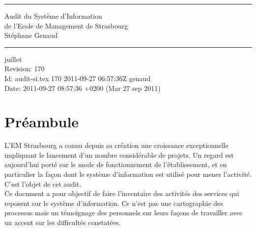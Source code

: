 \documentclass{book}
\begin{document}
\newcommand{\motcle}[1]{\index{#1}{#1}}
\newcommand{\clecommun}{stockage partagé en réseau\xspace}
\newcommand{\sre}{service relations entreprises\xspace}
\newcommand{\srh}{service ressources humaines\xspace}
\newcommand{\sop}{service organisation et process\xspace}
\newcommand{\scom}{service communication\xspace}
\newcommand{\sconc}{service concours\xspace}
\newcommand{\sintl}{service international\xspace}
\newcommand{\CK}{Christos Karacostas\xspace}
\newcommand{\NB}{Nicolas Beyhurst\xspace}


\thispagestyle{empty}
\rhead[]{}
\pagestyle{fancy}
\setlength{\parindent}{0mm}
\setlength{\parskip}{0mm}
\rule{\linewidth}{1mm}
\begin{center}
\Large{Audit du Système d'Information}\\[5mm]
\Large{de l'Ecole de Management de Strasbourg}\\[5mm]
\large{Stéphane Genaud}
\rule{\linewidth}{1mm}
\end{center}
\begin{center}
juillet  \\
\textrm{
Revision: 170 \\
Id: audit-si.tex 170 2011-09-27 06:57:36Z genaud\\
Date: 2011-09-27 08:57:36 +0200 (Mar 27 sep 2011)\\
}
\end{center}

\tableofcontents
\newpage


\chapter*{Préambule}

L'EM Strasbourg a connu depuis sa création une croissance exceptionnelle impliquant
le lancement d'un nombre considérable de projets. Un regard est aujourd'hui porté
sur le mode de fonctionnement de l'établissement, et en particulier la façon dont
le système d'information est utilisé pour mener l'activité. C'est l'objet de cet
audit.\\

Ce document a pour objectif de faire l'inventaire des activités des services qui
reposent sur le système d'information. Ce n'est pas une cartographie des processus
mais un témoignage des personnels sur leurs façons de travailler avec un accent
sur les difficultés constatées.\\
\end{document}
